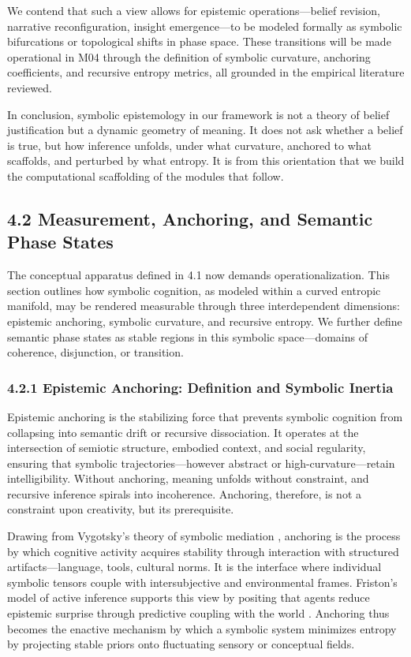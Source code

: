 We contend that such a view allows for epistemic operations—belief revision, narrative reconfiguration, insight emergence—to be modeled formally as symbolic bifurcations or topological shifts in phase space. These transitions will be made operational in M04 through the definition of symbolic curvature, anchoring coefficients, and recursive entropy metrics, all grounded in the empirical literature reviewed.

In conclusion, symbolic epistemology in our framework is not a theory of belief justification but a dynamic geometry of meaning. It does not ask whether a belief is true, but how inference unfolds, under what curvature, anchored to what scaffolds, and perturbed by what entropy. It is from this orientation that we build the computational scaffolding of the modules that follow.

\subsection*{4.2 Measurement, Anchoring, and Semantic Phase States}

The conceptual apparatus defined in 4.1 now demands operationalization. This section outlines how symbolic cognition, as modeled within a curved entropic manifold, may be rendered measurable through three interdependent dimensions: epistemic anchoring, symbolic curvature, and recursive entropy. We further define semantic phase states as stable regions in this symbolic space—domains of coherence, disjunction, or transition.

\subsubsection*{4.2.1 Epistemic Anchoring: Definition and Symbolic Inertia}

Epistemic anchoring is the stabilizing force that prevents symbolic cognition from collapsing into semantic drift or recursive dissociation. It operates at the intersection of semiotic structure, embodied context, and social regularity, ensuring that symbolic trajectories—however abstract or high-curvature—retain intelligibility. Without anchoring, meaning unfolds without constraint, and recursive inference spirals into incoherence. Anchoring, therefore, is not a constraint upon creativity, but its prerequisite.

Drawing from Vygotsky’s theory of symbolic mediation \cite{vygotsky1978mind}, anchoring is the process by which cognitive activity acquires stability through interaction with structured artifacts—language, tools, cultural norms. It is the interface where individual symbolic tensors couple with intersubjective and environmental frames. Friston’s model of active inference supports this view by positing that agents reduce epistemic surprise through predictive coupling with the world \cite{friston2010free}. Anchoring thus becomes the enactive mechanism by which a symbolic system minimizes entropy by projecting stable priors onto fluctuating sensory or conceptual fields.

